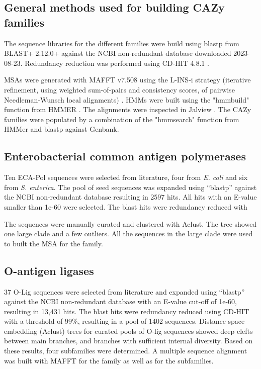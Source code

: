 \documentclass{article}
\begin{document}
\subsection{General methods used for building CAZy families}
The sequence libraries for the different families were build using blastp from BLAST+ 2.12.0+ \cite{camacho_blast_2009} against the NCBI non-redundant database downloaded 2023-08-23. Redundancy reduction was performed using CD-HIT 4.8.1 \cite{li_cd-hit_2006}.

MSAs were generated with MAFFT v7.508 using the L-INS-i strategy (iterative refinement, using weighted sum-of-pairs and consistency scores, of pairwise Needleman-Wunsch local alignments) \cite{katoh_mafft_2013}. HMMs were built using the "hmmbuild" function from HMMER \cite{finn_hmmer_2011}. The alignments were inspected in Jalview \cite{waterhouse_jalview_2009}. The CAZy families were populated by a combination of the "hmmsearch" function from HMMer and blastp against Genbank.

\subsection{Enterobacterial common antigen polymerases}
Ten ECA-Pol sequences were selected from literature, four from \textit{E. coli} and six from \textit{S. enterica}. The pool of seed sequences was expanded using “blastp” against the NCBI non-redundant database resulting in 2597 hits. All hits with an E-value smaller than 1e-60 were selected. The blast hits were redundancy reduced with 

The sequences were manually curated and clustered with Aclust. The tree showed one large clade and a few outliers. All the sequences in the large clade were used to built the MSA for the family.

\subsection{O-antigen ligases}
37 O-Lig sequences were selected from literature and expanded using “blastp” against the NCBI non-redundant database with an E-value cut-off of 1e-60, resulting in 13,431 hits. The blast hits were redundancy reduced using CD-HIT with a threshold of 99\%, resulting in a  pool of 1402 sequences. Distance space embedding (Aclust) trees for curated pools of O-lig sequences showed deep clefts between main branches, and branches with sufficient internal diversity. Based on these results, four subfamilies were determined. A multiple sequence alignment was built with MAFFT for the family as well as for the subfamilies.
\end{document}
